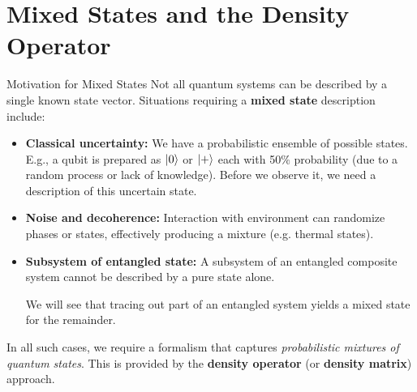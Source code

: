 \section{Mixed States and the Density Operator}

\begin{frame}{Motivation for Mixed States}
  Not all quantum systems can be described by a single known state vector. Situations requiring a \textbf{mixed state} description include:
  \begin{itemize}
    \item \textbf{Classical uncertainty:} We have a probabilistic ensemble of possible states. E.g., a qubit is prepared as $\ket{0}$ or $\ket{+}$ each with 50$\%$ probability (due to a random process or lack of knowledge). Before we observe it, we need a description of this uncertain state.
    \item \textbf{Noise and decoherence:} Interaction with environment can randomize phases or states, effectively producing a mixture (e.g. thermal states).
    \item \textbf{Subsystem of entangled state:} A subsystem of an entangled composite system cannot be described by a pure state alone.

We will see that tracing out part of an entangled system yields a mixed state for the remainder.
  \end{itemize}
  In all such cases, we require a formalism that captures \emph{probabilistic mixtures of quantum states}. This is provided by the \textbf{density operator} (or \textbf{density matrix}) approach.
\end{frame}

